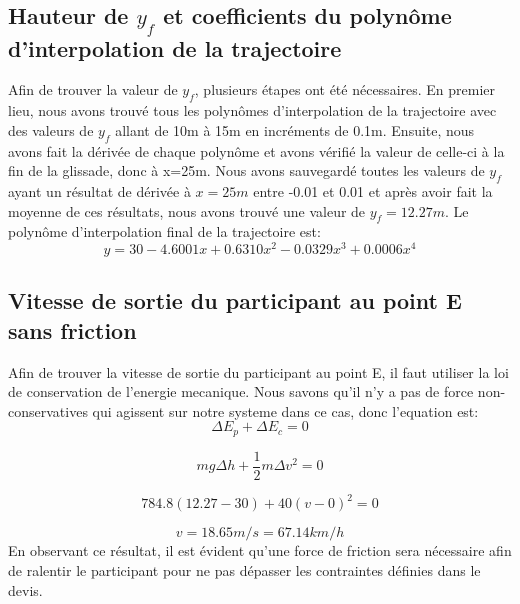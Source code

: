 \documentclass{article}
\begin{document}
\subsection{Hauteur de $y_f$ et coefficients du polynôme d'interpolation de la trajectoire}
Afin de trouver la valeur de $y_f$, plusieurs étapes ont été nécessaires. En premier lieu, nous avons trouvé tous les polynômes d'interpolation de la trajectoire avec des valeurs de $y_f$ allant de 10m à 15m en incréments de 0.1m. Ensuite, nous avons fait la dérivée de  chaque polynôme et avons vérifié la valeur de celle-ci à la fin de la glissade, donc à x=25m. Nous avons sauvegardé toutes les valeurs de $y_f$ ayant un résultat de dérivée à $x=25m$ entre -0.01 et 0.01 et après avoir fait la moyenne de ces résultats, nous avons trouvé une valeur de $y_f=12.27m$. Le polynôme d'interpolation final de la trajectoire est:
\begin{equation}
y = 30-4.6001x+0.6310x^2-0.0329x^3+0.0006x^4
\end{equation}

\subsection{Vitesse de sortie du participant au point E sans friction}
Afin de trouver la vitesse de sortie du participant au point E, il faut utiliser la loi de conservation de l'energie mecanique. Nous savons qu'il n'y a pas de force non-conservatives qui agissent sur notre systeme dans ce cas, donc l'equation est:
\begin{equation}
	\Delta E_p + \Delta E_c = 0
\end{equation}

\begin{equation}
	mg\Delta h + \frac{1}{2}m\Delta v^2 = 0
\end{equation}

\begin{equation}
	784.8(12.27-30) + 40(v-0)^2 = 0
\end{equation}

\begin{equation}
	v = 18.65 m/s = 67.14 km/h
\end{equation}
En observant ce résultat, il est évident qu'une force de friction sera nécessaire afin de ralentir le participant pour ne pas dépasser les contraintes définies dans le devis.
\end{document}

